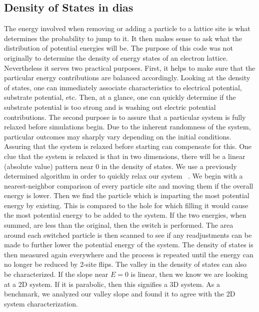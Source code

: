 \subsection {Density of States in {\sc dias}}
The energy involved when removing or adding a particle to a lattice site is what determines the probability to jump to it. It then makes sense to ask what the distribution of potential energies will be. The purpose of this code was not originally to determine the density of energy states of an electron lattice. Nevertheless it serves two practical purposes. First, it helps to make sure that the particular energy contributions are balanced accordingly. Looking at the density of states, one can immediately associate characteristics to electrical potential, substrate potential, etc. Then, at a glance, one can quickly determine if the substrate potential is too strong and is washing out electric potential contributions. The second purpose is to assure that a particular system is fully relaxed before simulations begin. Due to the inherent randomness of the system, particular outcomes may sharply vary depending on the initial conditions. Assuring that the system is relaxed before starting can compensate for this. One clue that the system is relaxed is that in two dimensions, there will be a linear (absolute value) pattern near $0$ in the density of states. We use a previously determined algorithm in order to quickly relax our system ~\cite{Vinokur08}. We begin with a nearest-neighbor comparison of every particle site and moving them if the overall energy is lower. Then we find the particle which is imparting the most potential energy by existing. This is compared to the hole for which filling it would cause the most potential energy to be added to the system. If the two energies, when summed, are less than the original, then the switch is performed. The area around each switched particle is then scanned to see if any readjustments can be made to further lower the potential energy of the system. The density of states is then measured again everywhere and the process is repeated until the energy can no longer be reduced by 2-site flips. The valley in the density of states can also be characterized. If the slope near $E=0$ is linear, then we know we are looking at a 2D system. If it is parabolic, then this signifies a 3D system. As a benchmark, we analyzed our valley slope and found it to agree with the 2D system characterization.



